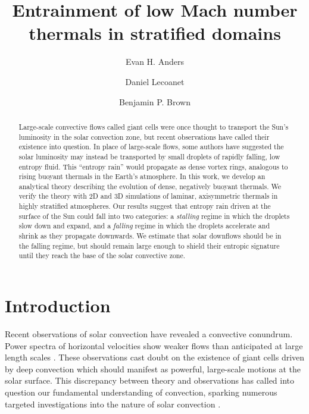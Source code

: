 \documentclass[twocolumn, amsmath, amsfonts, amssymb, trackchanges]{aastex62}
\begin{document}
\title{Entrainment of low Mach number thermals in stratified domains}


\author[0000-0002-3433-4733]{Evan H. Anders}
\author[0000-0002-7635-9728]{Daniel Lecoanet}
\author[0000-0001-8935-219X]{Benjamin P. Brown}


\begin{abstract}
Large-scale convective flows called giant cells were once thought to transport the Sun's luminosity in the solar convection zone, but recent observations have called their existence into question.
In place of large-scale flows, some authors have suggested the solar luminosity may instead be transported by small droplets of rapidly falling, low entropy fluid.
This ``entropy rain'' would propagate as dense vortex rings, analogous to rising buoyant thermals in the Earth's atmosphere.
In this work, we develop an analytical theory describing the evolution of dense, negatively buoyant thermals.
We verify the theory with 2D and 3D simulations of laminar, axisymmetric thermals in highly stratified atmospheres.
Our results suggest that entropy rain driven at the surface of the Sun could fall into two categories: a \emph{stalling} regime in which the droplets slow down and expand, and a \emph{falling} regime in which the droplets accelerate and shrink as they propagate downwards.
We estimate that solar downflows should be in the falling regime, but should remain large enough to shield their entropic signature until they reach the base of the solar convective zone.
\end{abstract}


\section{Introduction}
\label{sec:intro}
Recent observations of solar convection have revealed a convective conundrum.
Power spectra of horizontal velocities show weaker flows than anticipated at large length scales \citep{hanasoge&all2012, greer&all2015}.
These observations cast doubt on the existence of giant cells driven by deep convection which should manifest as powerful, large-scale motions at the solar surface. 
This discrepancy between theory and observations has called into question our fundamental understanding of convection, sparking numerous targeted investigations into the nature of solar convection  \citep{featherstone&hindman2016, omara&all2016, cossette&rast2016, kapyla&all2017, hotta2017}.
\end{document}

